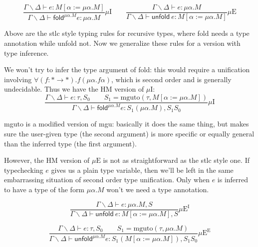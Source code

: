 \documentclass{article}
\newcommand{\mguto}[2]{\mathrm{mguto}(#1, #2)}
\newcommand{\fold}[2]{\textsf{fold}^{#1} #2}
\newcommand{\unfoldi}{\textsf{unfold} ~}
\newcommand{\unfold}[2]{\textsf{unfold}^{#1} #2}
\begin{document}
\begin{displaymath}
  \frac
    {\Gamma \backslash \Delta \vdash e : M[\alpha := \mu \alpha. M]}
    {\Gamma \backslash \Delta \vdash \fold{\mu \alpha. M}{e} : \mu \alpha. M}
  \mu \mathrm{I}
  \qquad
  \frac
    {\Gamma \backslash \Delta \vdash e : \mu \alpha. M}
    {\Gamma \backslash \Delta \vdash \unfoldi e : M[\alpha := \mu \alpha. M]}
  \mu \mathrm{E}
\end{displaymath}

Above are the stlc style typing rules for recursive types, where \textsf{fold} needs a type annotation while \textsf{unfold} not. Now we generalize these rules for a version with type inference.

We won't try to infer the type argument of \textsf{fold}: this would require a unification involving $\forall (f : * \to *). f (\mu \alpha. f \alpha)$, which is second order and is generally undecidable. Thus we have the HM version of $\mu \mathrm{I}$:
\begin{displaymath}
  \frac
    {\Gamma \backslash \Delta \vdash e : \tau, S_0 \qquad S_1 = \mguto{\tau}{M[\alpha := \mu \alpha. M]}}
    {\Gamma \backslash \Delta \vdash \fold{\mu \alpha. M}{e} : S_1(\mu \alpha. M), S_1 S_0}
  \mu \mathrm{I}
\end{displaymath}

\textrm{mguto} is a modified version of \textrm{mgu}: basically it does the same thing, but makes sure the user-given type (the second argument) is more specific or equally general than the inferred type (the first argument).

However, the HM version of $\mu \mathrm{E}$ is not as straightforward as the stlc style one. If typechecking $e$ gives us a plain type variable, then we'll be left in the same embarrassing situation of second order type unification. Only when $e$ is inferred to have a type of the form $\mu \alpha. M$ won't we need a type annotation.

\begin{displaymath}
  \frac
    {\Gamma \backslash \Delta \vdash e : \mu \alpha. M, S}
    {\Gamma \backslash \Delta \vdash \unfoldi e : M[\alpha := \mu \alpha. M], S}
  \mu \mathrm{E^I}
\end{displaymath}

\begin{displaymath}
  \frac
    {\Gamma \backslash \Delta \vdash e : \tau, S_0 \qquad S_1 = \mguto{\tau}{\mu \alpha. M} }
    {\Gamma \backslash \Delta \vdash \unfold{\mu \alpha. M}{e} : S_1 (M[\alpha := \mu \alpha. M]), S_1 S_0}
  \mu \mathrm{E^E}
\end{displaymath}
\end{document}
